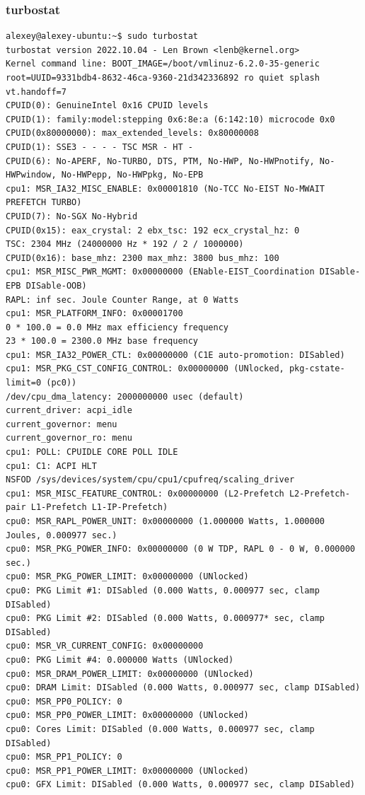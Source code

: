 \subsubsection{turbostat}
\begin{verbatim}
alexey@alexey-ubuntu:~$ sudo turbostat
turbostat version 2022.10.04 - Len Brown <lenb@kernel.org>
Kernel command line: BOOT_IMAGE=/boot/vmlinuz-6.2.0-35-generic root=UUID=9331bdb4-8632-46ca-9360-21d342336892 ro quiet splash vt.handoff=7
CPUID(0): GenuineIntel 0x16 CPUID levels
CPUID(1): family:model:stepping 0x6:8e:a (6:142:10) microcode 0x0
CPUID(0x80000000): max_extended_levels: 0x80000008
CPUID(1): SSE3 - - - - TSC MSR - HT -
CPUID(6): No-APERF, No-TURBO, DTS, PTM, No-HWP, No-HWPnotify, No-HWPwindow, No-HWPepp, No-HWPpkg, No-EPB
cpu1: MSR_IA32_MISC_ENABLE: 0x00001810 (No-TCC No-EIST No-MWAIT PREFETCH TURBO)
CPUID(7): No-SGX No-Hybrid
CPUID(0x15): eax_crystal: 2 ebx_tsc: 192 ecx_crystal_hz: 0
TSC: 2304 MHz (24000000 Hz * 192 / 2 / 1000000)
CPUID(0x16): base_mhz: 2300 max_mhz: 3800 bus_mhz: 100
cpu1: MSR_MISC_PWR_MGMT: 0x00000000 (ENable-EIST_Coordination DISable-EPB DISable-OOB)
RAPL: inf sec. Joule Counter Range, at 0 Watts
cpu1: MSR_PLATFORM_INFO: 0x00001700
0 * 100.0 = 0.0 MHz max efficiency frequency
23 * 100.0 = 2300.0 MHz base frequency
cpu1: MSR_IA32_POWER_CTL: 0x00000000 (C1E auto-promotion: DISabled)
cpu1: MSR_PKG_CST_CONFIG_CONTROL: 0x00000000 (UNlocked, pkg-cstate-limit=0 (pc0))
/dev/cpu_dma_latency: 2000000000 usec (default)
current_driver: acpi_idle
current_governor: menu
current_governor_ro: menu
cpu1: POLL: CPUIDLE CORE POLL IDLE
cpu1: C1: ACPI HLT
NSFOD /sys/devices/system/cpu/cpu1/cpufreq/scaling_driver
cpu1: MSR_MISC_FEATURE_CONTROL: 0x00000000 (L2-Prefetch L2-Prefetch-pair L1-Prefetch L1-IP-Prefetch)
cpu0: MSR_RAPL_POWER_UNIT: 0x00000000 (1.000000 Watts, 1.000000 Joules, 0.000977 sec.)
cpu0: MSR_PKG_POWER_INFO: 0x00000000 (0 W TDP, RAPL 0 - 0 W, 0.000000 sec.)
cpu0: MSR_PKG_POWER_LIMIT: 0x00000000 (UNlocked)
cpu0: PKG Limit #1: DISabled (0.000 Watts, 0.000977 sec, clamp DISabled)
cpu0: PKG Limit #2: DISabled (0.000 Watts, 0.000977* sec, clamp DISabled)
cpu0: MSR_VR_CURRENT_CONFIG: 0x00000000
cpu0: PKG Limit #4: 0.000000 Watts (UNlocked)
cpu0: MSR_DRAM_POWER_LIMIT: 0x00000000 (UNlocked)
cpu0: DRAM Limit: DISabled (0.000 Watts, 0.000977 sec, clamp DISabled)
cpu0: MSR_PP0_POLICY: 0
cpu0: MSR_PP0_POWER_LIMIT: 0x00000000 (UNlocked)
cpu0: Cores Limit: DISabled (0.000 Watts, 0.000977 sec, clamp DISabled)
cpu0: MSR_PP1_POLICY: 0
cpu0: MSR_PP1_POWER_LIMIT: 0x00000000 (UNlocked)
cpu0: GFX Limit: DISabled (0.000 Watts, 0.000977 sec, clamp DISabled)

\end{verbatim}

